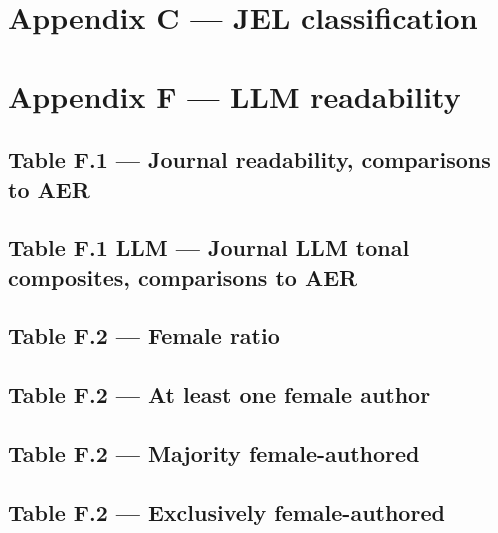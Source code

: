 \documentclass[12pt]{article}
\begin{document}
\section{Appendix C --- JEL classification}

\clearpage

\section{Appendix F --- LLM readability}

\subsection{Table F.1 --- Journal readability, comparisons to AER}

\clearpage

\subsection{Table F.1 LLM --- Journal LLM tonal composites, comparisons to AER}

\clearpage

\subsection{Table F.2 --- Female ratio}

\clearpage

\subsection{Table F.2 --- At least one female author}

\clearpage

\subsection{Table F.2 --- Majority female-authored}

\clearpage

\subsection{Table F.2 --- Exclusively female-authored}

\clearpage
\end{document}
